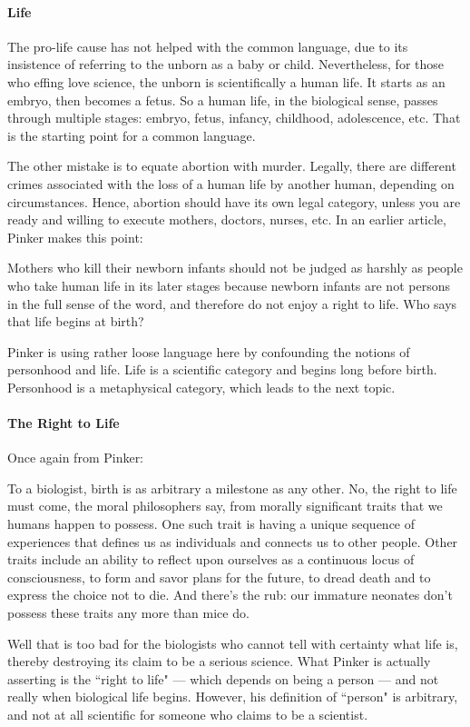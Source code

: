 \paragraph{Life}
The pro-life cause has not helped with the common language, due to its insistence of referring to the unborn as a baby or child. Nevertheless, for those who effing love science, the unborn is scientifically a human life. It starts as an embryo, then becomes a fetus. So a human life, in the biological sense, passes through multiple stages: embryo, fetus, infancy, childhood, adolescence, etc. That is the starting point for a common language.

The other mistake is to equate abortion with murder. Legally, there are different crimes associated with the loss of a human life by another human, depending on circumstances. Hence, abortion should have its own legal category, unless you are ready and willing to execute mothers, doctors, nurses, etc. In an earlier article, Pinker makes this point:

\begin{quotex}
Mothers who kill their newborn infants should not be judged as harshly as people who take human life in its later stages because newborn infants are not persons in the full sense of the word, and therefore do not enjoy a right to life. Who says that life begins at birth? 

\end{quotex}
Pinker is using rather loose language here by confounding the notions of personhood and life. Life is a scientific category and begins long before birth. Personhood is a metaphysical category, which leads to the next topic.

\paragraph{The Right to Life}
Once again from Pinker:

\begin{quotex}
To a biologist, birth is as arbitrary a milestone as any other. No, the right to life must come, the moral philosophers say, from morally significant traits that we humans happen to possess. One such trait is having a unique sequence of experiences that defines us as individuals and connects us to other people. Other traits include an ability to reflect upon ourselves as a continuous locus of consciousness, to form and savor plans for the future, to dread death and to express the choice not to die. And there's the rub: our immature neonates don't possess these traits any more than mice do. 

\end{quotex}
Well that is too bad for the biologists who cannot tell with certainty what life is, thereby destroying its claim to be a serious science. What Pinker is actually asserting is the ``right to life" — which depends on being a person — and not really when biological life begins. However, his definition of ``person" is arbitrary, and not at all scientific for someone who claims to be a scientist.

